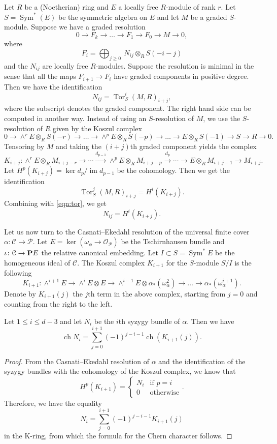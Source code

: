 \documentclass{amsart}
\DeclareMathOperator{\ch}{ch}
\DeclareMathOperator{\im}{im}
\newcommand{\orb}{\mathcal}
\renewcommand{\O}{{\mathcal O}}
\renewcommand {\P}{{\bf P}}
\providecommand {\from}{{\colon}}
\providecommand{\Tor}{\operatorname{Tor}}
\providecommand{\Sym}{\operatorname{Sym}}
\numberwithin{equation}{section}
\begin{document}
Let $R$ be a (Noetherian) ring and $E$ a locally free $R$-module of rank $r$.
Let $S = \Sym^*(E)$ be the symmetric algebra on $E$ and let $M$ be a graded $S$-module.
Suppose we have a graded resolution
\[ 0 \to F_k \to \dots \to F_1 \to F_0 \to M \to 0,\]
where
\[ F_i = \bigoplus_{j \geq 0} \ N_{ij} \otimes_R S(-i-j)\]
and the $N_{ij}$ are locally free $R$-modules.
Suppose the resolution is minimal in the sense that all the maps $F_{i+1} \to F_i$ have graded components in positive degree.
Then we have the identification
\begin{equation}\label{eqn:tor}
  N_{ij} = \Tor^i_S(M, R)_{i+j},
\end{equation}
where the subscript denotes the graded component.
The right hand side can be computed in another way.
Instead of using an $S$-resolution of $M$, we use the $S$-resolution of $R$ given by the Koszul complex
\[ 0 \to \wedge^r E \otimes_R S(-r) \to \dots \to \wedge^{p}E \otimes_R S(-p) \to \dots \to E \otimes_R S(-1) \to S \to R \to 0.\]
Tensoring by $M$ and taking the $(i+j)$th graded component yields the complex
\[K_{i+j}: \wedge^r E \otimes_R M_{i+j-r} \to \cdots \xrightarrow{d_{p-1}} \wedge^{p}E \otimes_R M_{i+j-p} \xrightarrow{d_p} \cdots \to E \otimes_R M_{i+j-1} \to M_{i+j}. \]
Let $H^p(K_{i+j}) = \ker d_p/\im d_{p-1}$ be the cohomology.
Then we get the identification
\[ \Tor_S^j(M, R)_{i+j} = H^i(K_{i+j}).\]
Combining with \eqref{eqn:tor}, we get
\[ N_{ij} = H^i(K_{i+j}).\]

Let us now turn to the Casnati--Ekedahl resolution of the universal finite cover $\alpha \from \orb C \to \orb P$.
Let $E = \ker(\omega_\phi \to \O_{\orb P})$ be the Tschirnhausen bundle and $\iota \from \orb C \to \P E$ the relative canonical embedding.
Let $I \subset S = \Sym^* E$ be the homogeneous ideal of $\orb C$.
The Koszul complex $K_{i+1}$ for the $S$-module $S/I$ is the following
\[K_{i+1}:  \wedge^{i+1}E \to \wedge^{i} E \otimes E \to \wedge^{i-1}E \otimes \alpha_*(\omega_\alpha^2) \to \dots \to \alpha_* (\omega_\alpha^{i+1}).\]
Denote by $K_{i+1}(j)$ the $j$th term in the above complex, starting from $j = 0$ and counting from the right to the left.

\begin{proposition}\label{prop:ch}
  Let $1 \leq i \leq d-3$ and let $N_i$ be the $i$th syzygy bundle of $\alpha$.
  Then we have
  \[ \ch N_i = \sum_{j=0}^{i+1} (-1)^{j-i-1} \ch \left(K_{i+1}(j)\right).\]
\end{proposition}
\begin{proof}
  From the Casnati--Ekedahl resolution of $\alpha$ and the identification of the syzygy bundles with the cohomology of the Koszul complex, we know that
  \[ H^p(K_{i+1}) =
  \begin{cases}
    N_i & \text{if $p = i$}\\
    0 & \text{otherwise}
  \end{cases}.
  \]
  Therefore, we have the equality
  \[ N_i = \sum_{j=0}^{i+1} (-1)^{j-i-1} K_{i+1}(j)\]
  in the K-ring, from which the formula for the Chern character follows.
\end{proof}
\end{document}
